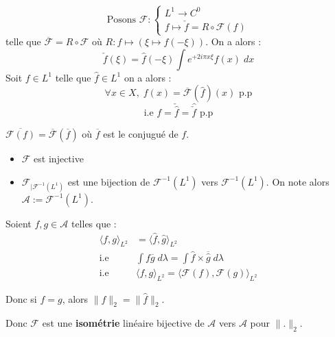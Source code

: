 \begin{theorem}[Inversion]
        \[ \text{Posons } \mathcal{F} : 
            \begin{cases}
                L^1 \longrightarrow C^0  \\ 
                f \longmapsto \check{f} = R \circ \mathcal{F}(f)
            \end{cases}
        \] telle que $\overline{\mathcal{F}} = R \circ \mathcal{F}$
    où $R : f \longmapsto (\xi \mapsto f(-\xi))$. On a alors :
            \[ \boxed{ \check{f}(\xi) = \widehat{f}(-\xi) \int e^{+ 2i\pi x \xi } f(x) \; dx }\] 
    Soit $f \in L^1$ telle que $\hat{f} \in L^1$ on a alors : 
            \[  \forall x \in X, \; f(x) = \overline{\mathcal{F}}(\hat{f})(x) \text{ p.p} \]
            \[ \text{i.e } f = \check{\hat{f}} = \hat{\check{f}} \text{ p.p} \]
\end{theorem}

\begin{remark}
    $\overline{\mathcal{F}(f)} = \overline{\mathcal{F}}(\overline{f})$ où $\overline{f}$ est le conjugué de $f$. 
\end{remark}

\begin{corollary}
    \begin{itemize}
        \item $\mathcal{F}$ est injective
        \item $\mathcal{F}_{ | \mathcal{F}^{-1}(L^1)}$ est une bijection de $\mathcal{F}^{-1}(L^1)$ vers $\mathcal{F}^{-1}(L^1)$. 
        On note alors $\mathcal{A} := \mathcal{F}^{-1}(L^1)$. 
    \end{itemize}
\end{corollary}

\begin{theorem}
    Soient $f,g \in \mathcal{A}$ telles que :
    \begin{align*}
        \langle f,g \rangle_{L^2} &= \langle \hat{f}, \hat{g} \rangle_{L^2} \\ 
        \text{i.e } & \int f \overline{g} \; d \lambda = \int \hat{f} \times \overline{\hat{g}} \; d \lambda \\ 
        \text{i.e } & \langle f, g \rangle_{L^2} = \langle \mathcal{F}(f), \mathcal{F}(g) \rangle_{L^2}
    \end{align*}

    Donc si $f=g$, alors $\| f \|_2 = \| \hat{f} \|_2$. 
    
    Donc $ \mathcal{F}$ est une \textbf{isométrie} linéaire bijective de $ \mathcal{A}$ vers $ \mathcal{A}$ pour $\|.\|_2$.
\end{theorem}

